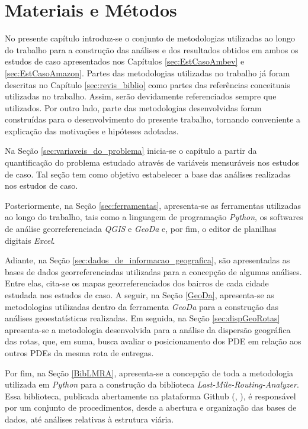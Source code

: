 \chapter{Materiais e Métodos} \label{sec:mat&met}

No presente capítulo introduz-se o conjunto de metodologias utilizadas ao longo do trabalho para a construção das análises e dos resultados obtidos em ambos os estudos de caso apresentados nos Capítulos \ref{sec:EstCasoAmbev} e \ref{sec:EstCasoAmazon}.
Partes das  metodologias utilizadas no trabalho já foram descritas no Capítulo \ref{sec:revis_biblio} como partes das referências conceituais utilizadas no trabalho. Assim, serão devidamente referenciados sempre que utilizados.
Por outro lado, parte das metodologias desenvolvidas foram construídas para o desenvolvimento do presente trabalho, tornando conveniente a explicação das motivações e hipóteses adotadas.

Na Seção \ref{sec:variaveis_do_problema} inicia-se o capítulo a partir da quantificação do problema estudado através de variáveis mensuráveis nos estudos de caso.
Tal seção tem como objetivo estabelecer a base das análises realizadas nos estudos de caso.

Posteriormente, na Seção \ref{sec:ferramentas}, apresenta-se as ferramentas utilizadas ao longo do trabalho, tais como a linguagem de programação \textit{Python}, os softwares de análise georreferenciada \textit{QGIS} e \textit{GeoDa} e, por fim, o editor de planilhas digitais \textit{Excel}.

Adiante, na Seção \ref{sec:dados_de_informacao_geografica}, são apresentadas as bases de dados georreferenciadas utilizadas para a concepção de algumas análises. Entre elas, cita-se os mapas georreferenciados dos bairros de cada cidade estudada nos estudos de caso. A seguir, na Seção \ref{GeoDa}, apresenta-se as metodologias utilizadas dentro da ferramenta \textit{GeoDa} para a construção das análises geoestatísticas realizadas. Em seguida, na Seção \ref{sec:dispGeoRotas} apresenta-se a metodologia desenvolvida para a análise da dispersão geográfica das rotas, que, em suma, busca avaliar o posicionamento dos PDE em relação aos outros PDEs da mesma rota de entregas.

Por fim, na Seção \ref{BibLMRA}, apresenta-se a concepção de toda a metodologia utilizada em \textit{Python} para a construção da biblioteca \textit{Last-Mile-Routing-Analyzer}. Essa biblioteca, publicada abertamente na plataforma Github (, \citeyear{guilherme_fernandes_alves_2022_6792977}), é responsável por um conjunto de procedimentos, desde a abertura e organização das bases de dados, até análises relativas à estrutura viária.

